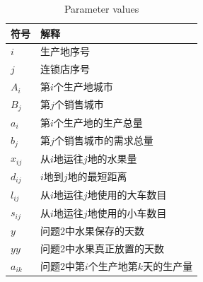 \documentclass{article}
\begin{document}
\begin{table}[H]
	\centering
	\caption{Parameter values}

		\begin{tabularx}{\textwidth}{lY}
			\toprule[1.5pt]
			符号&解释\\
			\midrule
			$i$&生产地序号\\
			$j$&连锁店序号\\
			$A_i$&第$i$个生产地城市\\
			$B_j$&第$j$个销售城市\\
			$a_i$&第$i$个生产地的生产总量\\
			$b_j$&第$j$个销售城市的需求总量\\
			$x_{ij}$&从$i$地运往$j$地的水果量\\
			$d_{ij}$&$i$地到$j$地的最短距离\\
			$l_{ij}$&从$i$地运往$j$地使用的大车数目\\
			$s_{ij}$&从$i$地运往$j$地使用的小车数目\\
			$y$&问题2中水果保存的天数\\
			$yy$&问题2中水果真正放置的天数\\
			$a_{ik}$&问题2中第$i$个生产地第$k$天的生产量 \\
			\bottomrule[1.5pt]
	\end{tabularx}
\end{table}

\begin{table}[htbp]
	\centering
	\caption{Add caption}
	\label{tab:addlabel4}%
\end{table}%
\end{document}
